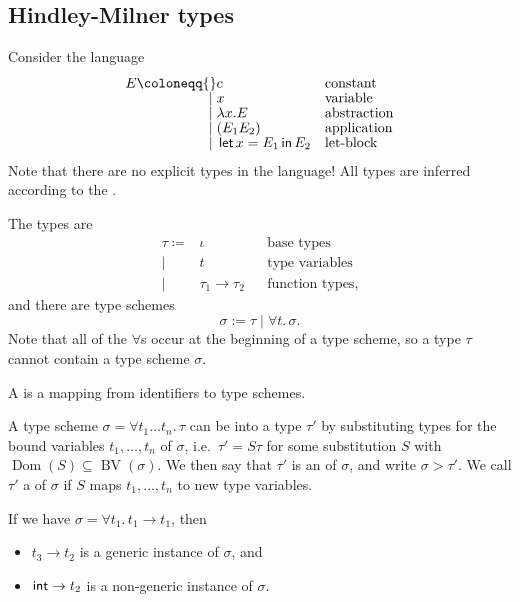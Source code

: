 \documentclass[class=scrartcl]{standalone}
\begin{document}
\subsection{Hindley-Milner types}
Consider the language
\begin{align*}
  E \coloneqq{} & c                     && \text{constant} \\[-1ex]
    {}\mid{}    & x                     && \text{variable} \\[-1ex]
    {}\mid{}    & \lambda x. E          && \text{abstraction} \\[-1ex]
    {}\mid{}    & (E_1 E_2)             && \text{application} \\[-1ex]
    {}\mid{}    & \pletin{x = E_1}{E_2} && \text{let-block}
\end{align*}
Note that there are no explicit types in the language!
All types are inferred according to the
.

The types are
\begin{align*}
  \tau \coloneqq{} & \iota             && \text{base types} \\[-1ex]
       {}\mid{}    & t                 && \text{type variables} \\[-1ex]
       {}\mid{}    & \tau_1 \to \tau_2 && \text{function types},
\end{align*}
and there are type schemes
\[
  \sigma := \tau \mid \forall t.\, \sigma.
\]
Note that all of the \(\forall\)s occur at the beginning of a type scheme,
so a type \(\tau\) cannot contain a type scheme \(\sigma\).

A  is a mapping from identifiers to type schemes.

A type scheme \(\sigma = \forall t_1 \dots t_n.\, \tau\)
can be  into a type \(\tau'\) by
substituting types for the bound variables \(t_1, \dots, t_n\) of \(\sigma\),
i.e.\ \(\tau' = S \tau\) for some substitution \(S\) with
\(\operatorname{Dom}(S) \subseteq \operatorname{BV}(\sigma)\).
We then say that \(\tau'\) is an  of \(\sigma\),
and write \(\sigma > \tau'\).
We call \(\tau'\) a  of \(\sigma\) if \(S\) maps
\(t_1, \dots, t_n\) to new type variables.

\begin{example}
  If we have \(\sigma = \forall t_1.\, t_1 \to t_1\), then
  \begin{itemize}[nosep]
    \item \(t_3 \to t_2\) is a generic instance of \(\sigma\), and
    \item \(\textsf{int} \to t_2\) is a non-generic instance of \(\sigma\).
  \end{itemize}
\end{example}
\end{document}
